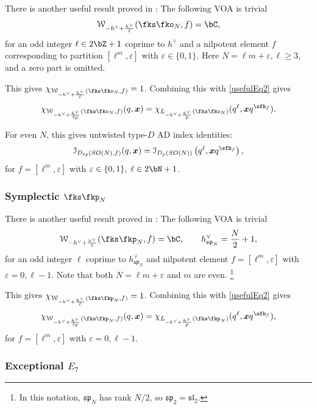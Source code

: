 \documentclass[a4paper,11pt]{article}
\theoremstyle{definition}
\theoremstyle{definition}
\theoremstyle{remark}
\newcommand{\be}{\begin{equation}}
\newcommand{\ee}{\end{equation}}
\begin{document}
There is another useful result proved in \cite[Theorem~9.14(1)]{Arakawa:2021ogm}: The following VOA is trivial
\be
\mathcal W_{-h^\vee+\frac{h^\vee}{ \ell   }}(\fks\fko_N,f)=\bC, 
\ee
for an odd integer $ \ell\in 2\bZ+1  $  coprime to $h^\vee$ and a nilpotent element  $f$ corresponding to partition $[\ell^m,\varepsilon ] $ with  $  \varepsilon\in\{0,1\}$. Here $N= \ell m+ \varepsilon, \ell \ge 3$, and a zero part is omitted.

This gives $  \chi_{\mathcal W_{-h^\vee+\frac{h^\vee}{ \ell   }}(\fks\fko_N,f)}=1$. Combining  this with  \eqref{usefulEq2} gives
 \be 
  \chi_{\mathcal W_{-h^\vee+\frac{h^\vee}{ \ell p }}(\fks\fko_N,f)}(q,\bm x)
 = 
 \chi_{L_{-h^\vee+\frac{h^\vee}{ p   }}(\fks\fko_N)}(q^\ell,\bm x q^{\sfh_f}).
 \label{usefulEq22}
\ee 
 
For even $ N$, this gives untwisted type-$ D$ AD index identities:
\be 
\mathcal I_{D_{\ell p}(SO(N),f)}(q,\bm x)
=
\mathcal I_{D_p(SO(N))}
\left(q^\ell,\bm xq^{\sfh_f}\right),
 \ee
for $ f=[\ell^m,\varepsilon]$ with $ \varepsilon\in \{0,1\}, \; \ell\in 2\bN+1$.   

\subsubsection{Symplectic   $\fks\fkp_N$  }


There is another useful result proved in \cite[Theorem~9.7(1)]{Arakawa:2021ogm}: The following VOA is trivial
\be
\mathcal W_{-h^\vee+\frac{h^\vee}{ \ell   }}(\fks\fkp_N,f)=\bC,  \qquad  h^\vee_{\mathfrak{sp}_N}=\frac{N}{2}+1,
\ee
for an odd integer $ \ell  $  coprime to $h^\vee_{\mathfrak{sp}_N}$ and nilpotent element  $f=[\ell^m,\varepsilon ] $ with  $  \varepsilon=0,\ell-1$. Note that both $N=\ell m+\varepsilon$ and $m$ are   even. \footnote{In this notation, $\mathfrak{sp}_N $ has rank $N/2$, so $\mathfrak{sp}_2 =\mathfrak{sl}_2$. } 

 

This gives $  \chi_{\mathcal W_{-h^\vee+\frac{h^\vee}{ \ell   }}(\fks\fkp_N,f)}=1$. Combining  this with  \eqref{usefulEq2} gives
 \be 
  \chi_{\mathcal W_{-h^\vee+\frac{h^\vee}{ \ell p }}(\fks\fkp_N,f)}(q,\bm x)
 = 
 \chi_{L_{-h^\vee+\frac{h^\vee}{ p   }}(\fks\fkp_N)}(q^\ell,\bm x q^{\sfh_f}),
 \label{usefulEq22sp}
\ee
for $f=[\ell^m,\varepsilon ] $ with  $  \varepsilon=0,\ell-1$.
 
\subsubsection{Exceptional   $E_7$}
 
\end{document}
